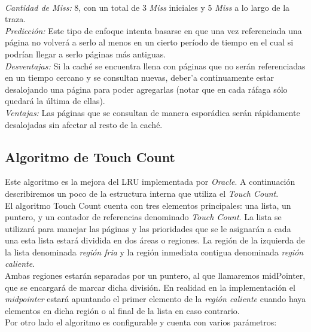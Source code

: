\documentclass[11pt, a4paper, spanish]{article}
\begin{document}
\\
\emph{Cantidad de Miss:} 8, con un total de 3 \textit{Miss} iniciales y 5 \textit{Miss} a lo largo de la traza. \\
\emph{Predicci\'on:} Este tipo de enfoque intenta basarse en que una vez referenciada una p\'agina no volver\'a a serlo al menos en un cierto per\'iodo
de tiempo en el cual si podr\'ian llegar a serlo p\'aginas m\'as antiguas.\\
\emph{Desventajas:} Si la cach\'e se encuentra llena con p\'aginas que no ser\'an referenciadas en un tiempo cercano y se consultan nuevas, deber'a continuamente estar desalojando una p\'agina para poder agregarlas (notar que en cada r\'afaga s\'olo quedar\'a la \'ultima de ellas).\\
\emph{Ventajas:} Las p\'aginas que se consultan de manera espor\'adica ser\'an r\'apidamente desalojadas sin afectar al resto de la cach\'e.\\

\newpage
\subsection{Algoritmo de Touch Count}

Este algoritmo es la mejora del LRU implementada por \textit{Oracle}. A continuaci\'on describiremos un poco de la estructura interna que utiliza el \textit{Touch Count}.\\

El algoritmo Touch Count cuenta con tres elementos principales: una lista, un puntero, y un contador de referencias denominado \textit{Touch Count}. 
La lista se utilizar\'a para manejar las p\'aginas y las prioridades que se le asignar\'an a cada
una esta lista estar\'a dividida en dos \'areas o regiones. La regi\'on de la izquierda de la lista denominada \textit{regi\'on fria} y la regi\'on inmediata
contigua denominada \textit{regi\'on caliente}.\\

Ambas regiones estar\'an separadas por un puntero, al que llamaremos midPointer, que se encargar\'a de marcar dicha divisi\'on. 
En realidad en la implementaci\'on el \textit{midpointer} estar\'a apuntando el primer elemento de la \textit{regi\'on caliente} cuando haya
elementos en dicha regi\'on o al final de la lista en caso contrario.\\

Por otro lado el algoritmo es configurable y cuenta con varios par\'ametros:
\end{document}

